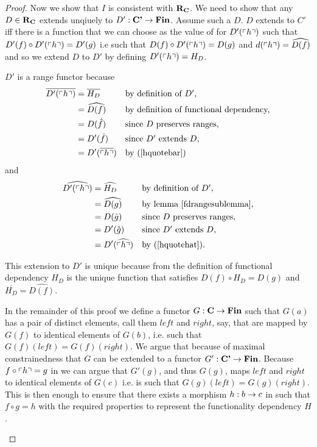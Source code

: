 \begin{proof}
Now we show that $I$ is consistent with $\textbf{R}_{\textbf{C}}$. 
We need to show that any $D \in \textbf{R}_{\textbf{C}}$
extends unqiuely to $D' :\textbf{C'} \rightarrow \textbf{Fin}$. Assume such a $D$. 
$D$  extends to $C'$ iff there is a  function that we can choose as the value of  for $D'(\left\ulcorner h\right\urcorner)$  such that $D'(f) \circ D'(\left\ulcorner h\right\urcorner) = D'(g)$ i.e such that
$D(f) \circ D'(\left\ulcorner h\right\urcorner) = D(g)$ and $d(\left\ulcorner h\right\urcorner)=\widehat{D(f)}$
and so we  extend $D$ to $D'$ 
 by defining $D'(\left\ulcorner h\right\urcorner)=H_D$.
\begin{newtt}
$D'$ is a range functor because
\begin{align*}
\overline{D'(\left\ulcorner h\right\urcorner)}&= \overline{H_D} && \mbox{by definition of $D'$,}  \\
                     &= \widehat{D(f)} && \mbox{by definition of functional dependency,} \\
                     &= D(\hat{f})     && \mbox{since $D$ preserves ranges,} \\
                     &= D'(\hat{f})     && \mbox{since $D'$ extends $D$,} \\
                     &= D'(\overline{\left\ulcorner h\right\urcorner}) && \mbox{by (\ref{hquotebar})}
\end{align*}
and 
\begin{align*}
\widehat{D'(\left\ulcorner h\right\urcorner)}&= \widehat{H_D}       && \mbox{by definition of $D'$,}  \\
                    &= \widehat{D(g)}      && \mbox{by lemma \ref{fdrangesublemma},}   \\
                    &= D(\hat{g})          && \mbox{since $D$ preserves ranges,}   \\
                    &= D'(\hat{g})         && \mbox{since $D'$ extends $D$, } \\
                    &=D'(\widehat{\left\ulcorner h\right\urcorner}) && \mbox{by (\ref{hquotehat}).}
\end{align*}
\end{newtt}
This extension to $D'$ is unique because from the definition of functional dependency
$H_D$ is the unique function 
that satisfies $D(f) \circ H_D = D(g)$ and $\overline{H_D}=\widehat{D(f)}$.

\begin{newtt}
In the remainder of this proof 
we define a functor $G: \textbf{C} \rightarrow \textbf{Fin}$ such that
$G(a)$ has a pair of distinct elements, call them $left$ and $right$, say,  that are mapped by $G(f)$ to identical elements
of $G(b)$, i.e. such that $G(f)(left)= G(f)(right)$.  
We  argue that because of  maximal constrainedness that $G$ can be extended to a functor 
$G' : \textbf{C'} \rightarrow \textbf{Fin}$. 
Because $f \circ \left\ulcorner h\right\urcorner = g$ in \catcpw we can argue that $G'(g)$,
and thus $G(g)$,
maps $left$ and $right$ to identical elements of $G(c)$ 
i.e. is such that $G(g)(left)= G(g)(right)$. 
This  is then enough 
to ensure that there exists a morphism $h:b \rightarrow c$ in \catc
such that $f \circ g = h$
 with the required properties to represent the functionality dependency $H$.
\end{newtt}


\end{proof}
